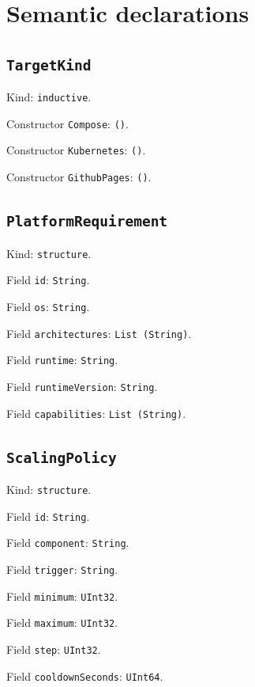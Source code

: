 \documentclass[11pt]{article}
\begin{document}
\section*{Semantic declarations}
\subsection*{\texttt{TargetKind}}
\noindent Kind: \texttt{inductive}.\par
\noindent Constructor \texttt{Compose}: \texttt{()}.\par
\noindent Constructor \texttt{Kubernetes}: \texttt{()}.\par
\noindent Constructor \texttt{GithubPages}: \texttt{()}.\par
\subsection*{\texttt{PlatformRequirement}}
\noindent Kind: \texttt{structure}.\par
\noindent Field \texttt{id}: \texttt{String}.\par
\noindent Field \texttt{os}: \texttt{String}.\par
\noindent Field \texttt{architectures}: \texttt{List (String)}.\par
\noindent Field \texttt{runtime}: \texttt{String}.\par
\noindent Field \texttt{runtimeVersion}: \texttt{String}.\par
\noindent Field \texttt{capabilities}: \texttt{List (String)}.\par
\subsection*{\texttt{ScalingPolicy}}
\noindent Kind: \texttt{structure}.\par
\noindent Field \texttt{id}: \texttt{String}.\par
\noindent Field \texttt{component}: \texttt{String}.\par
\noindent Field \texttt{trigger}: \texttt{String}.\par
\noindent Field \texttt{minimum}: \texttt{UInt32}.\par
\noindent Field \texttt{maximum}: \texttt{UInt32}.\par
\noindent Field \texttt{step}: \texttt{UInt32}.\par
\noindent Field \texttt{cooldownSeconds}: \texttt{UInt64}.\par
\end{document}
